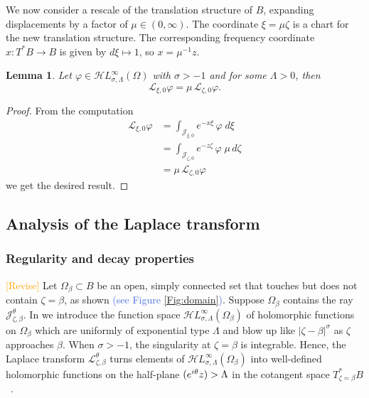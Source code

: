 \documentclass{article}
\let\Re\relax
\DeclareMathOperator{\Re}{Re}
\newcommand{\singexp}[2]{\mathcal{H}L^\infty_{#1, #2}}
\newcommand{\maps}{\colon}
\newcommand{\laplace}{\mathcal{L}}
\theoremstyle{definition}
\theoremstyle{plain}
\newtheorem{lemma}[definition]{Lemma}
\begin{document}
We now consider a rescale of the translation structure of $B$, expanding displacements by a factor of $\mu \in (0, \infty)$. The coordinate $\xi = \mu\zeta$ is a chart for the new translation structure. The corresponding frequency coordinate $x \maps T^*B \to B$ is given by $d\xi \mapsto 1$, so $x = \mu^{-1} z$. 
\begin{lemma}
Let $\varphi\in\singexp{\sigma}{\Lambda}(\Omega)$ with $\sigma>-1$ and for some $\Lambda>0$, then
    \[ \laplace_{\xi, 0} \varphi = \mu\,\laplace_{\zeta, 0} \varphi. \]
\end{lemma}
\begin{proof}
    From the computation 
    \begin{align*}
\laplace_{\xi, 0} \varphi & = \int_{\mathcal{J}_{\xi, 0}} e^{-x\xi}\,\varphi\;d\xi \\
& = \int_{\mathcal{J}_{\zeta, 0}} e^{-z \zeta}\,\varphi\;\mu\,d\zeta \\
& = \mu\,\laplace_{\zeta, 0} \varphi
\end{align*}
we get the desired result. 
\end{proof}
%
\subsection{Analysis of the Laplace transform}\label{sec:laplace_analytic}
%
\subsubsection{Regularity and decay properties}\label{sec:reg-decay}
%
\textcolor{orange}{[Revise]} Let $\Omega_\beta \subset B$ be an open, simply connected set that touches but does not contain $\zeta = \beta$, as shown \textcolor{RoyalBlue}{(see Figure \ref{Fig:domain})}. Suppose $\Omega_\beta$ contains the ray $\mathcal{J}_{\zeta, \beta}^\theta$. In \cite{reg-sing-volterra} we introduce the function space $\singexp{\sigma}{\Lambda}(\Omega_\beta)$ of holomorphic functions on $\Omega_\beta$ which are uniformly of exponential type $\Lambda$ and blow up like $|\zeta - \beta|^\sigma$ as $\zeta$ approaches $\beta$. When $\sigma>-1$, the singularity at $\zeta = \beta$ is integrable. Hence, the Laplace transform $\laplace_{\zeta, \beta}^\theta$ turns elements of $\singexp{\sigma}{\Lambda}(\Omega_\beta)$ into well-defined holomorphic functions on the half-plane $\Re(e^{i\theta} z) > \Lambda$ in the cotangent space $T_{\zeta = \beta}^*B$~\cite[Section  5.6]{diverg-resurg-i}.
\end{document}
